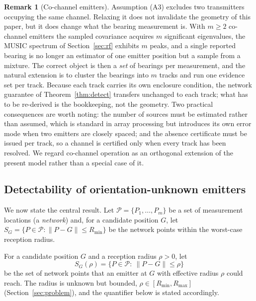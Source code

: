 \documentclass[preprint,12pt,3p]{elsarticle}
\theoremstyle{definition}
\newtheorem{remark}[theorem]{Remark}
\newcommand{\Rmin}{R_{\min}}
\newcommand{\Rmax}{R_{\max}}
\newcommand{\bP}{\mathcal{P}}
\begin{document}
\begin{remark}[Co-channel emitters]
\label{rem:cochannel}
Assumption (A3) excludes two transmitters occupying the same channel. Relaxing it does not
invalidate the geometry of this paper, but it does change what the bearing measurement is.
With $m\ge2$ co-channel emitters the sampled covariance acquires $m$ significant eigenvalues, the
MUSIC spectrum of Section~\ref{sec:rf} exhibits $m$ peaks, and a single reported bearing is no
longer an estimator of one emitter position but a sample from a mixture. The correct object is
then a \emph{set} of bearings per measurement, and the natural extension is to cluster the
bearings into $m$ tracks and run one evidence set per track. Because each track carries its own
enclosure condition, the network guarantee of Theorem~\ref{thm:detect} transfers unchanged to
each track; what has to be re-derived is the bookkeeping, not the geometry. Two practical
consequences are worth noting: the number of sources must be estimated rather than assumed, which
is standard in array processing but introduces its own error mode when two emitters are closely
spaced; and the absence certificate must be issued per track, so a channel is certified only when
every track has been resolved. We regard co-channel operation as an orthogonal extension of the
present model rather than a special case of it.
\end{remark}

\subsection{Detectability of orientation-unknown emitters}
\label{sec:detect}

We now state the central result. Let $\bP=\{P_1,\dots,P_m\}$ be a set of measurement locations
(a \emph{network}) and, for a candidate position $G$, let
$S_G=\{P\in\bP:\|P-G\|\le\Rmin\}$ be the network points within the worst-case reception radius.

For a candidate position $G$ and a reception radius $\rho>0$, let
\begin{equation}
S_G(\rho)=\{P\in\bP:\ \|P-G\|\le\rho\}
\label{eq:SGrho}
\end{equation}
be the set of network points that an emitter at $G$ with effective radius $\rho$ could reach. The
radius is unknown but bounded, $\rho\in[\Rmin,\Rmax]$ (Section~\ref{sec:problem}), and the
quantifier below is stated accordingly.
\end{document}
